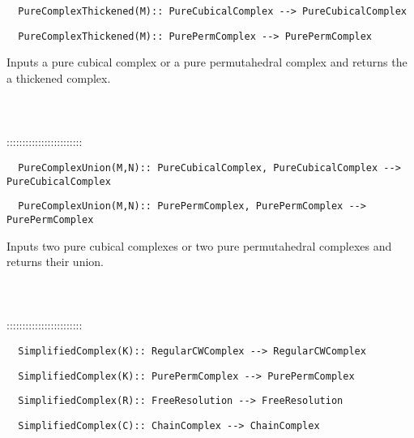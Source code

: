 \documentclass[a4paper,11pt]{report}
\begin{document}
{\begin{verbatim}  PureComplexThickened(M):: PureCubicalComplex --> PureCubicalComplex
\end{verbatim}
 
\begin{verbatim}  PureComplexThickened(M):: PurePermComplex --> PurePermComplex
\end{verbatim}


 

 Inputs a pure cubical complex or a pure permutahedral complex and returns the
a thickened complex. \\
 \\
 \\
 \\
 ::::::::::::::::::::::::\\
 
\begin{verbatim}  PureComplexUnion(M,N):: PureCubicalComplex, PureCubicalComplex --> PureCubicalComplex
\end{verbatim}
 
\begin{verbatim}  PureComplexUnion(M,N):: PurePermComplex, PurePermComplex --> PurePermComplex
\end{verbatim}


 

 Inputs two pure cubical complexes or two pure permutahedral complexes and
returns their union. \\
 \\
 \\
 \\
 ::::::::::::::::::::::::\\
 
\begin{verbatim}  SimplifiedComplex(K):: RegularCWComplex --> RegularCWComplex
\end{verbatim}
 
\begin{verbatim}  SimplifiedComplex(K):: PurePermComplex --> PurePermComplex
\end{verbatim}
 
\begin{verbatim}  SimplifiedComplex(R):: FreeResolution --> FreeResolution
\end{verbatim}
 
\begin{verbatim}  SimplifiedComplex(C):: ChainComplex --> ChainComplex
\end{verbatim}


}
\end{document}
